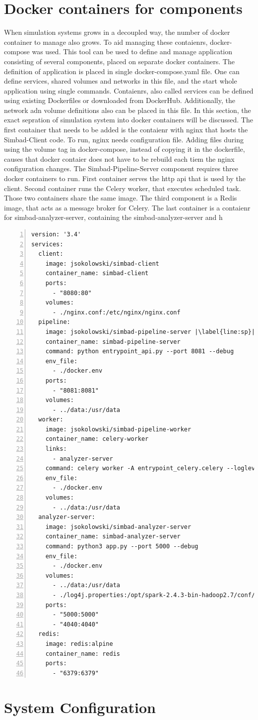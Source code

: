 \section{Docker containers for components}
When simulation systems grows in a decoupled way, the number of docker container to manage also grows. To aid managing these contaienrs, docker-compose was used. This tool can be used to define and manage application consisting of several components, placed on separate docker containers. The definition of application is placed in single docker-compose.yaml file. One can define services, shared volumes and networks in this file, and the start whole application using single commands. Contaienrs, also called services can be defined using existing Dockerfiles or downloaded from DockerHub. Additionally, the network adn volume definitions also can be placed in this file. In this section, the exact sepration of simulation system into docker containers will be discussed. 
The first container that needs to be added is the contaienr with nginx that hosts the Simbad-Client code. To run, nginx needs configuration file. Adding files during using the volume tag in docker-compose, instead of copying it in the dockerfile, causes that docker contaier does not have to be rebuild each tiem the nginx configuration changes.
The Simbad-Pipeline-Server component requires three docker containers to run. First container serves the http api that is used by the client. Second container runs the Celery worker, that executes scheduled task. Those two containers share the same image. The third component is a Redis image, that acts as a message broker for Celery. The last container is a contaienr for simbad-analyzer-server, containing the simbad-analyzer-server and h
\newpage
\begin{lstlisting}[label=list:sp-exec-local-use,caption=Use of LocalExecutor for SimBaD-CLI step, basicstyle=\footnotesize\ttfamily, numbers=left, escapechar=|]
version: '3.4'
services:
  client:
    image: jsokolowski/simbad-client
    container_name: simbad-client
    ports:
      - "8080:80"
    volumes:
      - ./nginx.conf:/etc/nginx/nginx.conf
  pipeline:
    image: jsokolowski/simbad-pipeline-server |\label{line:sp}|
    container_name: simbad-pipeline-server
    command: python entrypoint_api.py --port 8081 --debug
    env_file:
      - ./docker.env
    ports:
      - "8081:8081"
    volumes:
      - ../data:/usr/data
  worker:
    image: jsokolowski/simbad-pipeline-worker
    container_name: celery-worker
    links:
      - analyzer-server
    command: celery worker -A entrypoint_celery.celery --loglevel=info
    env_file:
      - ./docker.env
    volumes:
      - ../data:/usr/data
  analyzer-server:
    image: jsokolowski/simbad-analyzer-server
    container_name: simbad-analyzer-server
    command: python3 app.py --port 5000 --debug
    env_file:
      - ./docker.env
    volumes:
      - ../data:/usr/data
      - ./log4j.properties:/opt/spark-2.4.3-bin-hadoop2.7/conf/log4j.properties
    ports:
      - "5000:5000"
      - "4040:4040"
  redis:
    image: redis:alpine
    container_name: redis
    ports:
      - "6379:6379"
\end{lstlisting}
\section{System Configuration}
\label{sec:dockerconf}